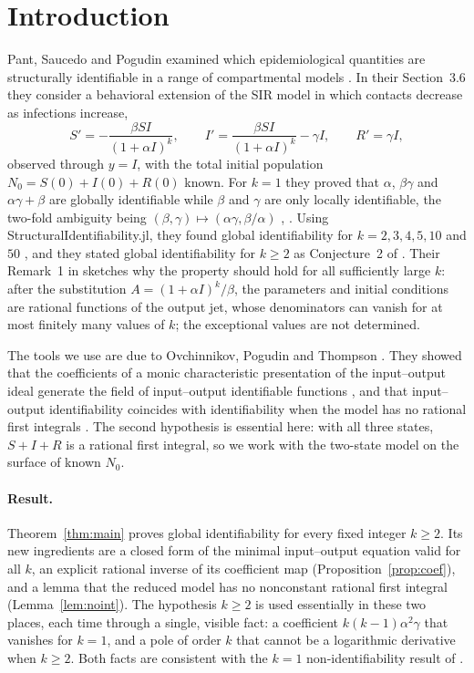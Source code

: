 \documentclass[10pt,a4paper]{article}
\theoremstyle{definition}
\theoremstyle{remark}
\begin{document}
\section{Introduction}
\label{sec:intro}
Pant, Saucedo and Pogudin examined which epidemiological quantities are
structurally identifiable in a range of compartmental models
\cite{PSP}. In their Section~3.6 they consider a behavioral extension of
the SIR model in which contacts decrease as infections increase,
\begin{equation}
 S'=-\frac{\beta SI}{(1+\alpha I)^k},\qquad
 I'=\frac{\beta SI}{(1+\alpha I)^k}-\gamma I,\qquad
 R'=\gamma I,
 \label{eq:model}
\end{equation}
observed through $y=I$, with the total initial population
$N_0=S(0)+I(0)+R(0)$ known. For $k=1$ they proved that $\alpha$,
$\beta\gamma$ and $\alpha\gamma+\beta$ are globally identifiable while
$\beta$ and $\gamma$ are only locally identifiable, the two-fold ambiguity
being $(\beta,\gamma)\mapsto(\alpha\gamma,\beta/\alpha)$
\cite[Theorem~3.8]{PSP}, \cite[Section~S8]{PSPsupp}. Using
\mbox{StructuralIdentifiability.jl}, they found global identifiability for
$k=2,3,4,5,10$ and $50$ \cite[Section~S9]{PSPsupp}, and they stated global identifiability for
$k\geq2$ as Conjecture~2 of \cite{PSP}. Their Remark~1 in
\cite[Section~S9]{PSPsupp} sketches why the property should hold for all
sufficiently large $k$: after the substitution $A=(1+\alpha I)^k/\beta$,
the parameters and initial conditions are rational functions of the
output jet, whose denominators can vanish for at most finitely many
values of $k$; the exceptional values are not determined.

The tools we use are due to Ovchinnikov, Pogudin and Thompson \cite{OPT}.
They showed that the coefficients of a monic characteristic presentation
of the input--output ideal generate the field of input--output
identifiable functions \cite[Corollary~5.7]{OPT}, and that input--output
identifiability coincides with identifiability when the model has no
rational first integrals \cite[Theorem~4.7]{OPT}. The second hypothesis
is essential here: with all three states, $S+I+R$ is a rational first
integral, so we work with the two-state model on the surface of known
$N_0$.

\paragraph{Result.}
Theorem~\ref{thm:main} proves global identifiability for every fixed
integer $k\geq2$. Its new ingredients are a closed form of the minimal
input--output equation valid for all $k$, an explicit rational inverse of
its coefficient map (Proposition~\ref{prop:coef}), and a lemma that the
reduced model has no nonconstant rational first integral
(Lemma~\ref{lem:noint}). The hypothesis $k\geq2$ is used essentially in
these two places, each time through a single, visible fact: a coefficient $k(k-1)\alpha^2\gamma$ that
vanishes for $k=1$, and a pole of order $k$ that cannot be a logarithmic
derivative when $k\geq2$. Both facts are consistent with the $k=1$
non-identifiability result of \cite{PSP}.
\end{document}
